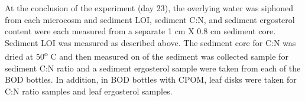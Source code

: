 At the conclusion of the experiment (day 23), the overlying water was siphoned from each microcosm and sediment LOI, sediment C:N, and sediment ergosterol content were each measured from a separate 1 cm X 0.8 cm sediment core. Sediment LOI was measured as described above. The sediment core for C:N was dried at 50\textsuperscript{o} C and then measured on of the sediment was collected sample for sediment C:N ratio and a sediment ergosterol sample were taken from each of the BOD bottles. In addition, in BOD bottles with CPOM, leaf disks were taken for C:N ratio samples and leaf ergosterol samples. 